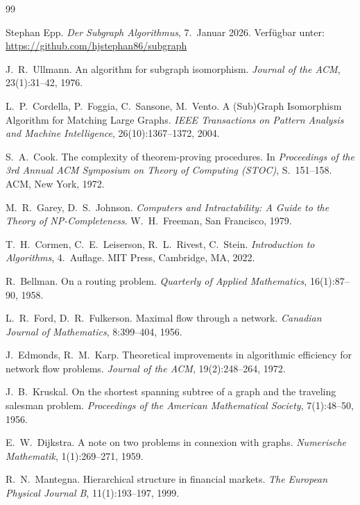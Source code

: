 \documentclass[a4paper,12pt]{article}
\begin{document}
\begin{thebibliography}{99}

Stephan Epp.
\textit{Der Subgraph Algorithmus}, 7.\ Januar 2026.
Verfügbar unter: \url{https://github.com/hjstephan86/subgraph}

J.~R.~Ullmann.
\newblock An algorithm for subgraph isomorphism.
\newblock \textit{Journal of the ACM}, 23(1):31--42, 1976.

L.~P.~Cordella, P.~Foggia, C.~Sansone, M.~Vento.
\newblock A (Sub)Graph Isomorphism Algorithm for Matching Large Graphs.
\newblock \textit{IEEE Transactions on Pattern Analysis and Machine
  Intelligence}, 26(10):1367--1372, 2004.

S.~A.~Cook.
\newblock The complexity of theorem-proving procedures.
\newblock In \textit{Proceedings of the 3rd Annual ACM Symposium on Theory
  of Computing (STOC)}, S.~151--158. ACM, New York, 1972.

M.~R.~Garey, D.~S.~Johnson.
\newblock \textit{Computers and Intractability: A Guide to the Theory of
  NP-Completeness}.
\newblock W.~H.~Freeman, San Francisco, 1979.

T.~H.~Cormen, C.~E.~Leiserson, R.~L.~Rivest, C.~Stein.
\newblock \textit{Introduction to Algorithms}, 4.~Auflage.
\newblock MIT Press, Cambridge, MA, 2022.

R.~Bellman.
\newblock On a routing problem.
\newblock \textit{Quarterly of Applied Mathematics}, 16(1):87--90, 1958.

L.~R.~Ford, D.~R.~Fulkerson.
\newblock Maximal flow through a network.
\newblock \textit{Canadian Journal of Mathematics}, 8:399--404, 1956.

J.~Edmonds, R.~M.~Karp.
\newblock Theoretical improvements in algorithmic efficiency for network
  flow problems.
\newblock \textit{Journal of the ACM}, 19(2):248--264, 1972.

J.~B.~Kruskal.
\newblock On the shortest spanning subtree of a graph and the traveling
  salesman problem.
\newblock \textit{Proceedings of the American Mathematical Society},
  7(1):48--50, 1956.

E.~W.~Dijkstra.
\newblock A note on two problems in connexion with graphs.
\newblock \textit{Numerische Mathematik}, 1(1):269--271, 1959.

R.~N.~Mantegna.
\newblock Hierarchical structure in financial markets.
\newblock \textit{The European Physical Journal B}, 11(1):193--197, 1999.


\end{thebibliography}
\end{document}
